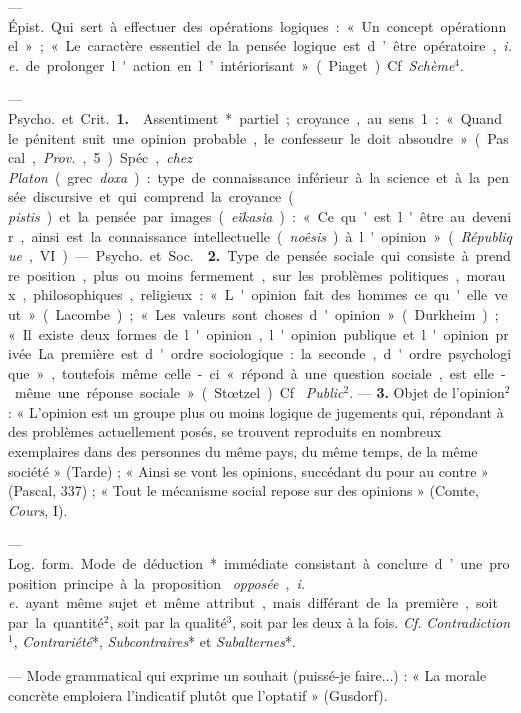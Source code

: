 \begin{itemize}[leftmargin=1cm, label=, itemsep=1pt]
 — \si{Épist.} Qui sert à effectuer des
opérations logiques : « Un concept opérationnel » ; « Le caractère essentiel
de la pensée logique est d’être opératoire, {\it i. e.} de prolonger l'action
en l’intériorisant » (Piaget). Cf. {\it Schème}$^4$.

 — \si{Psycho.} et \si{Crit.} {\bf 1.} 
Assentiment* partiel ; croyance, au sens 1 : « Quand le pénitent suit une
opinion probable, le confesseur le doit absoudre » (Pascal, {\it Prov.}, 5).
Spéc., {\it chez Platon} (grec {\it doxa}) : type de connaissance inférieur à
la science et à la pensée discursive et qui comprend la croyance ({\it
pistis}) et la pensée par images ({\it eïkasia}) : « Ce qu'est l'être au
devenir, ainsi est la connaissance intellectuelle ({\it noêsis}) à l'opinion
» ({\it République}, VI).

— \si{Psycho.} et \si{Soc.}  {\bf 2.} Type de
pensée sociale qui consiste à prendre position, plus ou moins fermement, sur
les problèmes politiques, moraux, philosophiques, religieux : « L'opinion
fait des hommes ce qu'elle veut » (Lacombe) ; « Les valeurs sont choses
d'opinion » (Durkheim) ; « Il existe deux formes de l'opinion, l'opinion
publique et l'opinion privée. La première est d'ordre sociologique: ... la
seconde, d'ordre psychologique », toutefois même celle-ci « répond à une
question sociale, est elle-même une réponse sociale » (Stœtzel). Cf. {\it
Public}$^2$. —  {\bf 3.} Objet de l'opinion$^2$ : « L'opinion
est un groupe plus ou moins logique de jugements qui, répondant à des
problèmes actuellement posés, se trouvent reproduits en nombreux exemplaires
dans des personnes du même pays, du même temps, de la même société
» (Tarde) ; « Ainsi se vont les opinions, succédant du pour au contre
» (Pascal, 337) ; « Tout le mécanisme social repose sur des opinions
» (Comte, {\it Cours}, I).

 — \si{Log.} \si{form.} Mode de déduction* immédiate
consistant à conclure d’une proposition principe à la proposition {\it
opposée}, {\it i. e.} ayant même sujet et même attribut, mais différant de la
première, soit par la quantité$^2$, soit par la qualité$^3$, soit par les deux à
la fois. {\it Cf.} {\it Contradiction}$^1$, {\it Contrariété}*, {\it
Subcontraires}* et {\it Subalternes}*.

 — Mode grammatical qui exprime un souhait (puissé-je faire...) :
« La morale concrète emploiera l'indicatif plutôt que l’optatif » (Gusdorf).


\end{itemize}
